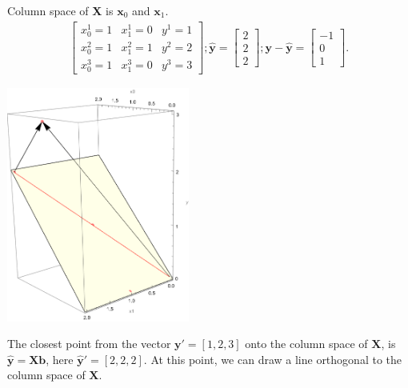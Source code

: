 \documentclass[a4paper,12pt]{article}
\begin{document}
{Column space of \textbf{X} is $\textbf{x}_0$ and $\textbf{x}_1$.
\begin{eqnarray}
\begin{bmatrix}
x^1_{0}=1 & x^1_{1}=0 & y^1=1\\
x^2_{0}=1 & x^2_{1}=1 & y^2=2\\
x^3_{0}=1 & x^3_{1}=0 & y^3=3
\end{bmatrix};
\bm{\hat{y}}=\begin{bmatrix}
2\\
2 \\
2
\end{bmatrix};
\bm{y}-\bm{\hat{y}}=\begin{bmatrix}
-1\\
0 \\
1
\end{bmatrix}.\nonumber
\end{eqnarray}

\begin{multicols}{2}  %
        \begin{center}
        \includegraphics[width=0.45\textwidth]{figures/projection}
        \label{fig:projection}
        \end{center}
    \columnbreak  %

    \vspace*{2cm}

    The closest point from the vector $\bm{y}'=[1,2,3]$ onto the column space of $\bm{X}$, is $\bm{\hat{y}}=\bm{X}\bm{b}$, here $\bm{\hat{y}}'=[2,2,2]$. At this point, we can draw a line orthogonal to the column space of $\bm{X}$.

 \
\end{multicols}  %

}
\end{document}
